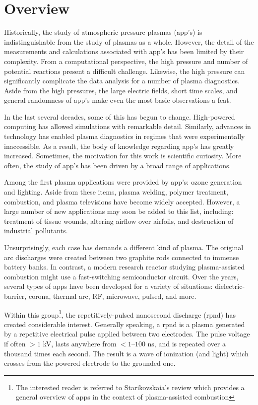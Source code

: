 \section{Overview}

Historically, the study of atmospheric-pressure plasmas (\acs{app}'s) is
indistinguishable from the study of plasmas as a whole. However, the detail of
the measurements and calculations associated with \acs{app}'s has been limited
by their complexity. From a computational perspective, the high pressure and
number of potential reactions present a difficult challenge. Likewise, the high
pressure can significantly complicate the data analysis for a number of plasma
diagnostics. Aside from the high pressures, the large electric fields, short
time scales, and general randomness of \acs{app}'s make even the most basic
observations a feat.

In the last several decades, some of this has begun to change. High-powered
computing has allowed simulations with remarkable detail. Similarly, advances in
technology has enabled plasma diagnostics in regimes that were experimentally
inaccessible. As a result, the body of knowledge regarding \acs{app}'s has
greatly increased. Sometimes, the motivation for this work is scientific
curiosity. More often, the study of \acs{app}'s has been driven by a broad range
of applications.

Among the first plasma applications were provided by \acs{app}'s: ozone
generation and lighting. Aside from these items, plasma welding, polymer
treatment, combustion, and plasma televisions have become widely accepted.
However, a large number of new applications may soon be added to this list,
including: treatment of tissue wounds, altering airflow over airfoils, and
destruction of industrial pollutants.

Unsurprisingly, each case has demands a different kind of plasma. The original
arc discharges were created between two graphite rods connected to immense
battery banks. In contrast, a modern research reactor studying plasma-assisted
combustion might use a fast-switching semiconductor circuit. Over the years,
several types of \acs{app}s have been developed for a variety of situations:
dielectric-barrier, corona, thermal arc, RF, microwave, pulsed, and more.

Within this group\footnote{The interested reader is referred to Starikovskaia's
review \cite{Starikovskaia2006} which provides a general overview of \acs{app}s
in the context of plasma-assisted combustion}, the repetitively-pulsed
nanosecond discharge (\acs{rpnd}) has created considerable interest. Generally
speaking, a \acs{rpnd} is a plasma generated by a repetitive electrical pulse
applied between two electrodes. The pulse voltage if often $>1$ kV, lasts
anywhere from $<1$--$100$ ns, and is repeated over a thousand times each second.
The result is a wave of ionization (and light) which crosses from the powered
electrode to the grounded one.

